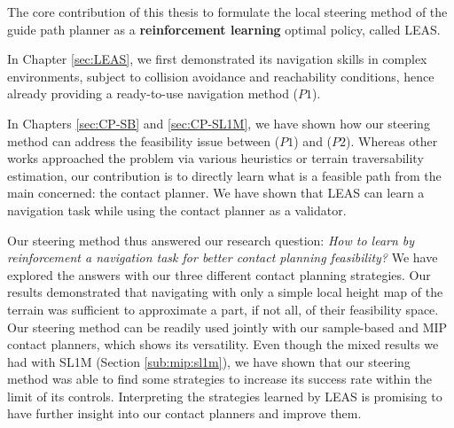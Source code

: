 The core contribution of this thesis to formulate the local steering method of the guide path planner as a \textbf{reinforcement learning} optimal policy, called LEAS.

In Chapter \ref{sec:LEAS}, we first demonstrated its navigation skills in complex environments, subject to collision avoidance and reachability conditions, hence already providing a ready-to-use navigation method ($P1$).


In Chapters \ref{sec:CP-SB} and \ref{sec:CP-SL1M}, we have shown how our steering method can address the feasibility issue between ($P1$) and ($P2$).
Whereas other works approached the problem via various heuristics or terrain traversability estimation, our contribution is to directly learn what is a feasible path from the main concerned: the contact planner.
We have shown that LEAS can learn a navigation task while using the contact planner as a validator.



Our steering method thus answered our research question: \textit{How to learn by reinforcement a navigation task for better contact planning feasibility?}
We have explored the answers with our three different contact planning strategies.
Our results demonstrated that navigating with only a simple local height map of the terrain was sufficient to approximate a part, if not all, of their feasibility space.
Our steering method can be readily used jointly with our sample-based and MIP contact planners, which shows its versatility. 
Even though the mixed results we had with SL1M (Section \ref{sub:mip:sl1m}), we have shown that our steering method was able to find some strategies to increase its success rate within the limit of its controls.
Interpreting the strategies learned by LEAS is promising to have further insight into our contact planners and improve them.

